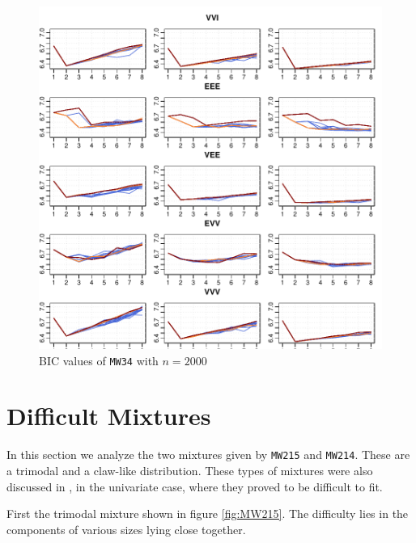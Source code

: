 \begin{figure}[h!]
    \begin{Rgraph}[0.9]
\includegraphics{chapter3-figmw34bicsecond}
    \caption{BIC values of {\tt MW34} with $n=2000$}
    \label{fig:bicmw34second}
    \end{Rgraph}
\end{figure}

\clearpage

\section{Difficult Mixtures}
\label{sec:dif}

In this section we analyze the two mixtures given by {\tt MW215} and {\tt MW214}.
These are a trimodal and a claw-like distribution. These types of mixtures were 
also discussed in \cite{Mar92}, in the univariate case, where they proved to be 
difficult to fit.

First the trimodal mixture shown in figure \ref{fig:MW215}. The difficulty 
lies in the components of various sizes lying close together.

